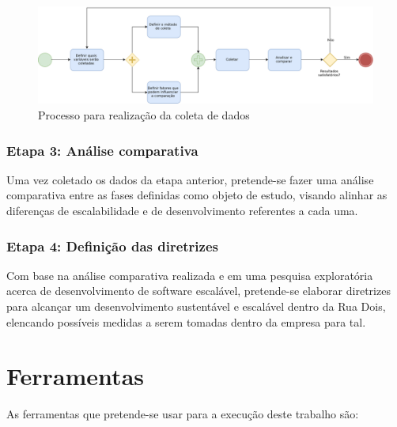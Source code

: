     \begin{figure}[h]
      \caption{Processo para realização da coleta de dados\label{fig:ProcessoAnaliseComparativa}}
      \centering
      \includegraphics[keepaspectratio=true,scale=0.5]{figuras/metodologiaAnalise.eps}
    \end{figure}

\subsubsection{Etapa 3: Análise comparativa}

Uma vez coletado os dados da etapa anterior, pretende-se fazer uma análise comparativa
entre as fases definidas como objeto de estudo, visando alinhar as diferenças de
escalabilidade e de desenvolvimento referentes a cada uma.

\subsubsection{Etapa 4: Definição das diretrizes}

Com base na análise comparativa realizada e em uma pesquisa exploratória acerca de
desenvolvimento de software escalável, pretende-se elaborar diretrizes para alcançar
um desenvolvimento sustentável e escalável dentro da Rua Dois, elencando possíveis
medidas a serem tomadas dentro da empresa para tal.


\section{Ferramentas}

As ferramentas que pretende-se usar para a execução deste trabalho são:

